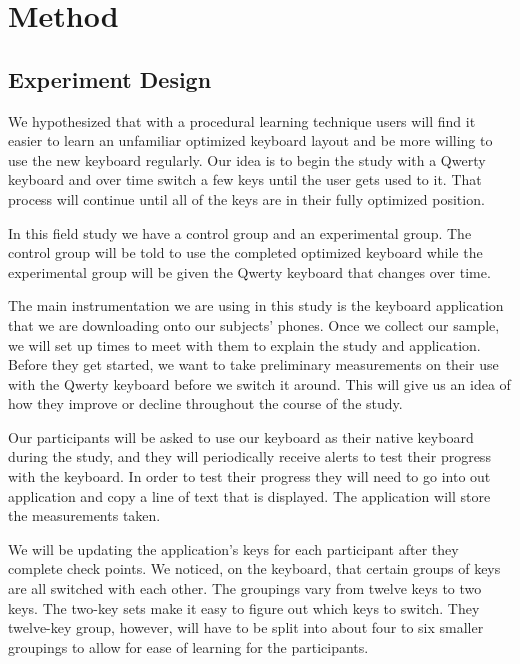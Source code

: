 \section{Method}

\subsection{Experiment Design}

We hypothesized that with a procedural learning technique users will find it easier to learn an unfamiliar optimized keyboard layout and be more willing to use the new keyboard regularly.  Our idea is to begin the study with a Qwerty keyboard and over time switch a few keys until the user gets used to it.  That process will continue until all of the keys are in their fully optimized position.

In this field study we have a control group and an experimental group.  The control group will be told to use the completed optimized keyboard while the experimental group will be given the Qwerty keyboard that changes over time.  

The main instrumentation we are using in this study is the keyboard application that we are downloading onto our subjects' phones. Once we collect our sample, we will set up times to meet with them to explain the study and application.  Before they get started, we want to take preliminary measurements on their use with the Qwerty keyboard before we switch it around. This will give us an idea of how they improve or decline throughout the course of the study.  

Our participants will be asked to use our keyboard as their native keyboard during the study, and they will periodically receive alerts to test their progress with the keyboard.   In order to test their progress they will need to go into out application and copy a line of text that is displayed.  The application will store the measurements taken.


We will be updating the application's keys for each participant after they complete  check points.    We noticed, on the keyboard, that certain groups of keys are all switched with each other.  The groupings vary from twelve keys to two keys.  The two-key sets make it easy to figure out which keys to switch.  They twelve-key group, however, will have to be split into about four to six smaller groupings to allow for ease of learning for the participants.  

